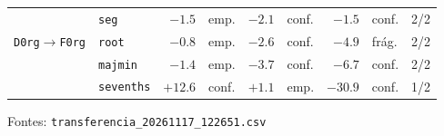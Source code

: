\begin{table}[t]
\begin{tabular}{llrlrlrlc}
     & \texttt{seg} & $-1.5$ & emp. & $-2.1$ & conf. & $-1.5$ & conf. & 2/2 \\
    \addlinespace
    \texttt{D0rg}$\to$\texttt{F0rg} & \texttt{root} & $-0.8$ & emp. & $-2.6$ & conf. & $-4.9$ & frág. & 2/2 \\
     & \texttt{majmin} & $-1.4$ & emp. & $-3.7$ & conf. & $-6.7$ & conf. & 2/2 \\
     & \texttt{sevenths} & $+12.6$ & conf. & $+1.1$ & emp. & $-30.9$ & conf. & 1/2 \\
    \bottomrule
  \end{tabular}
  \vspace{2pt}
  \parbox{\linewidth}{\footnotesize Fontes: \texttt{transferencia\_20261117\_122651.csv}}
\end{table}
